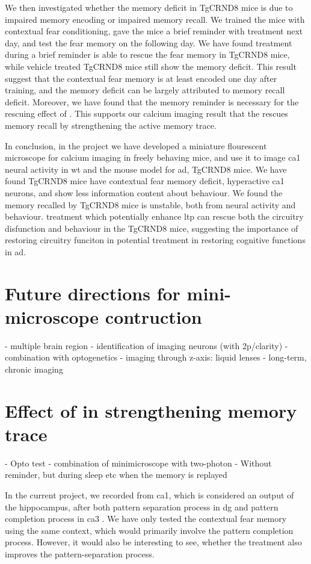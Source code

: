We then investigated whether the memory deficit in TgCRND8 mice is due to impaired memory encoding or impaired memory recall. We trained the mice with contextual fear conditioning, gave the mice a brief reminder with \tglu treatment next day, and test the fear memory on the following day. We have found \tglu treatment during a brief reminder is able to rescue the fear memory in TgCRND8 mice, while vehicle treated TgCRND8 mice still show the memory deficit. This result suggest that the contextual fear memory is at least encoded one day after training, and the memory deficit can be largely attributed to memory recall deficit. Moreover, we have found that the memory reminder is necessary for the rescuing effect of \tglu. This supports our calcium imaging result that the \tglu rescues memory recall by strengthening the active memory trace. 

In conclusion, in the project we have developed a miniature flourescent microscope for calcium imaging in freely behaving mice, and use it to image \gls{ca1} neural activity in \gls{wt} and the mouse model for \gls{ad}, TgCRND8 mice. We have found TgCRND8 mice have contextual fear memory deficit, hyperactive \gls{ca1} neurons, and show less information content about behaviour. We found the memory recalled by TgCRND8 mice is unstable, both from neural activity and behaviour. \tglu treatment which potentially enhance \gls{ltp} can rescue both the circuitry disfunction and behaviour in the TgCRND8 mice, suggesting the importance of restoring circuitry funciton in potential treatment in restoring cognitive functions in \gls{ad}.

\section{Future directions for mini-microscope contruction}
- multiple brain region
- identification of imaging neurons (with 2p/clarity)
- combination with optogenetics
- imaging through z-axis: liquid lenses
- long-term, chronic imaging

\section{Effect of \tglu in strengthening memory trace}
- Opto test - combination of minimicroscope with two-photon
- Without reminder, but during sleep etc when the memory is replayed

In the current project, we recorded from \gls{ca1}, which is considered an output of the hippocampus, after both pattern separation process in \gls{dg} and pattern completion process in \gls{ca3} . We have only tested the contextual fear memory using the same context, which would primarily involve the pattern completion process. However, it would also be interesting to see, whether the \tglu treatment also improves the pattern-separation process. \citet{migues16} 

